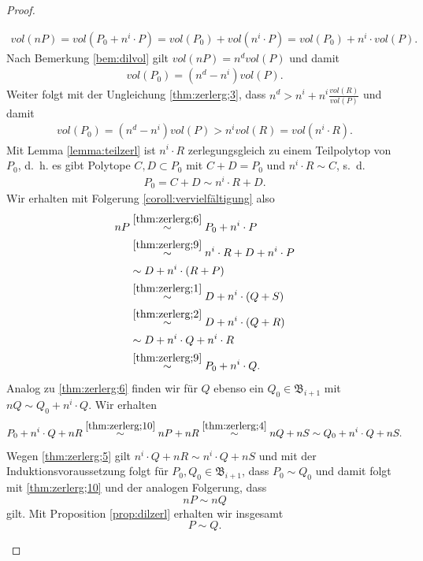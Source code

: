 \documentclass[11pt,titlepage]{article}
\theoremstyle{definition}
\theoremstyle{remark}
\begin{document}
\begin{proof}
\begin{itemize}
			\begin{align*}
			vol(nP)=vol(P_0+n^i\cdot P)=vol(P_0)+vol(n^i\cdot P)=vol(P_0)+
			n^i\cdot vol(P).
			\end{align*}
			Nach Bemerkung \ref{bem:dilvol} gilt $vol(nP)=n^d vol(P)$ und damit 
			\begin{align}
			vol(P_0)=(n^d -n^i)vol(P). \label{thm:zerlerg;7}
			\end{align}
			Weiter folgt mit der Ungleichung \ref{thm:zerlerg;3}, dass 
			$n^d > n^i+n^i\frac{vol(R)}{vol(P)}$ und damit
			\begin{align}
				vol(P_0)=(n^d -n^i)vol(P)>n^i vol(R)=vol(n^i\cdot R)\label{thm:zerlerg;8}.
			\end{align}
			Mit Lemma \ref{lemma:teilzerl} 
			ist $n^i\cdot R$ zerlegungsgleich zu einem Teilpolytop von $P_0$, d.~h. es gibt Polytope $C,D\subset P_0$ mit $C+D=P_0$ und $n^i\cdot R\sim C$, s.~d. 
			\begin{align}
			P_0=C+D\sim n^i\cdot R+D. \label{thm:zerlerg;9}
			\end{align}
			Wir erhalten mit Folgerung \ref{coroll:vervielfältigung} also
			\begin{align}
			nP &\overset{\ref{thm:zerlerg;6}}{\sim} P_0+n^i \cdot P \notag\\
			&\overset{\ref{thm:zerlerg;9}}{\sim} n^i\cdot R +D+n^i \cdot P \notag\\
			&\sim D+n^i\cdot(R+P) \notag\\ 
			&\overset{\ref{thm:zerlerg;1}}{\sim} D+n^i\cdot(Q+S) \notag\\
			&\overset{\ref{thm:zerlerg;2}}{\sim} D+n^i\cdot(Q+R) \notag\\
			&\sim D+n^i\cdot Q +n^i\cdot R \notag\\
			&\overset{\ref{thm:zerlerg;9}}{\sim} P_0+n^i \cdot Q. \label{thm:zerlerg;10}
			\end{align}
			Analog zu \ref{thm:zerlerg;6} finden wir für $Q$ ebenso ein 
			$Q_0\in\mathfrak{B}_{i+1}$ mit $nQ\sim Q_0+n^i\cdot Q$. Wir erhalten 
			\[P_0+n^i\cdot Q+nR\overset{\ref{thm:zerlerg;10}}{\sim}
			nP+nR\overset{\ref{thm:zerlerg;4}}{\sim}nQ+nS\sim Q_0+n^i\cdot Q+nS.\]
			Wegen \ref{thm:zerlerg;5} gilt $n^i\cdot Q+nR\sim n^i\cdot Q +nS$ und 
			mit der Induktionsvoraussetzung folgt für 
			$P_0,Q_0\in\mathfrak{B}_{i+1}$, dass 
			$P_0\sim Q_0$ und damit folgt mit \ref{thm:zerlerg;10} und der 
			analogen Folgerung, dass 
			\[nP\sim nQ\]
			gilt. Mit Proposition \ref{prop:dilzerl} erhalten wir insgesamt 
			\[P\sim Q.\]
		\end{itemize}
	\end{proof}
	
\end{document}
